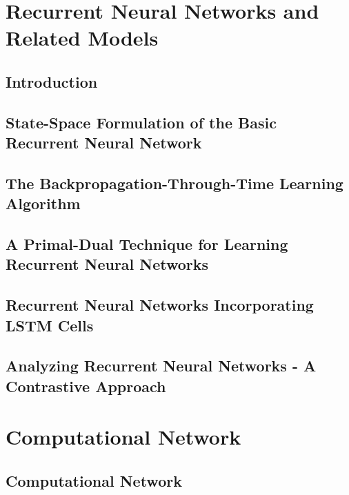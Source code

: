 \documentclass[a4paper]{article}
\begin{document}
\newpage
\section{Recurrent Neural Networks and Related Models}
\subsection{Introduction}

\subsection{State-Space Formulation of the Basic Recurrent Neural Network}

\subsection{The Backpropagation-Through-Time Learning Algorithm}

\subsection{A Primal-Dual Technique for Learning Recurrent Neural Networks}

\subsection{Recurrent Neural Networks Incorporating LSTM Cells}

\subsection{Analyzing Recurrent Neural Networks - A Contrastive Approach}


\newpage
\section{Computational Network}
\subsection{Computational Network}
\end{document}

